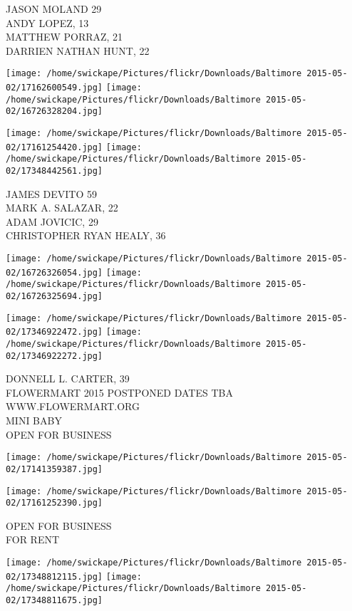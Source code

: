 \documentclass[10pt,letterpaper]{article}
\begin{document}
JASON MOLAND 29\\
ANDY LOPEZ, 13\\
MATTHEW PORRAZ, 21\\
DARRIEN NATHAN HUNT, 22\\
\pagebreak

\texttt{[image: /home/swickape/Pictures/flickr/Downloads/Baltimore 2015-05-02/17162600549.jpg]}
\texttt{[image: /home/swickape/Pictures/flickr/Downloads/Baltimore 2015-05-02/16726328204.jpg]}

\texttt{[image: /home/swickape/Pictures/flickr/Downloads/Baltimore 2015-05-02/17161254420.jpg]}
\texttt{[image: /home/swickape/Pictures/flickr/Downloads/Baltimore 2015-05-02/17348442561.jpg]}

JAMES DEVITO 59\\
MARK A. SALAZAR, 22\\
ADAM JOVICIC, 29\\
CHRISTOPHER RYAN HEALY, 36\\
\pagebreak

\texttt{[image: /home/swickape/Pictures/flickr/Downloads/Baltimore 2015-05-02/16726326054.jpg]}
\texttt{[image: /home/swickape/Pictures/flickr/Downloads/Baltimore 2015-05-02/16726325694.jpg]}

\texttt{[image: /home/swickape/Pictures/flickr/Downloads/Baltimore 2015-05-02/17346922472.jpg]}
\texttt{[image: /home/swickape/Pictures/flickr/Downloads/Baltimore 2015-05-02/17346922272.jpg]}

DONNELL L. CARTER, 39\\
FLOWERMART 2015 POSTPONED DATES TBA WWW.FLOWERMART.ORG\\
MINI BABY\\
OPEN FOR BUSINESS\\
\pagebreak

\texttt{[image: /home/swickape/Pictures/flickr/Downloads/Baltimore 2015-05-02/17141359387.jpg]}

\vspace{0.25in}
\texttt{[image: /home/swickape/Pictures/flickr/Downloads/Baltimore 2015-05-02/17161252390.jpg]}

OPEN FOR BUSINESS\\
FOR RENT\\
\pagebreak

\texttt{[image: /home/swickape/Pictures/flickr/Downloads/Baltimore 2015-05-02/17348812115.jpg]}
\texttt{[image: /home/swickape/Pictures/flickr/Downloads/Baltimore 2015-05-02/17348811675.jpg]}
\end{document}
